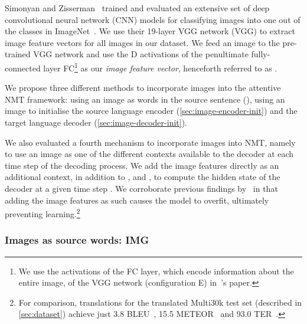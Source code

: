 \documentclass[11pt,twocolumn]{article}
\begin{document}
Simonyan and Zisserman~ trained and evaluated an extensive set of deep convolutional neural network (CNN) models for classifying images into one out of the  classes in ImageNet~\cite{Russakovskyetal2014}.
We use their 19-layer VGG network (VGG) to extract image feature vectors for all images in our dataset.
We feed an image to the pre-trained VGG network and use the D activations of the penultimate fully-connected layer
FC\footnote{We use the activations of the FC layer, which encode information about the entire image, of the VGG network (configuration E) in~'s paper.}
as our \emph{image feature vector}, henceforth referred to as .

We propose three different methods to incorporate images into the attentive NMT framework:
using an image as words in the source sentence (), using an image to initialise the source language encoder (\cref{sec:image-encoder-init}) and the target language decoder (\cref{sec:image-decoder-init}).

We also evaluated a fourth mechanism to incorporate images into NMT, namely to use an image as one of the different contexts available to the decoder at each time step of the decoding process.
We add the image features directly as an additional context,
in addition to ,  and ,
to compute the hidden state  of the decoder at a given time step .
We corroborate previous findings by~ in that adding the image features as such causes the model to overfit, ultimately preventing learning.\footnote{For comparison, translations for the translated Multi30k test set (described in \cref{sec:dataset}) achieve just 3.8 BLEU~\cite{Papinenietal2002}, 15.5 METEOR~\cite{DenkowskiLavie2014} and 93.0 TER~\cite{Snoveretal2006}.}

\begin{comment}
\begin{figure}[t!]
 \centering
 \texttt{[image: img/image-as-context\_3.png]}
 \caption{Using image features as an additional context
 at each time step  of the decoder.}
 \label{fig:image-as-context}
\end{figure}
\end{comment}

\subsubsection{Images as source words: \texorpdfstring{IMG}{}}
\label{sec:image-as-word}
\end{document}
